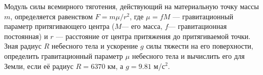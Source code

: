 Модуль силы всемирного тяготения, действующий на материальную точку
массы $m$, определяется равенством $F=m\mu/r^2$, где $\mu=fM$ ---
гравитационный параметр притягивающего центра ($M$--- его масса, $f$---
гравитационная постоянная) и $r$ --- расстояние от центра притяжения до
притягиваемой точки. Зная радиус $R$ небесного тела и ускорение $g$ силы
тяжести на его поверхности, определить гравитационный параметр $\mu$
небесного тела и вычислить его для Земли, если её радиус $R=6370$ км,
а $g=9.81$ м/с$^2$.
